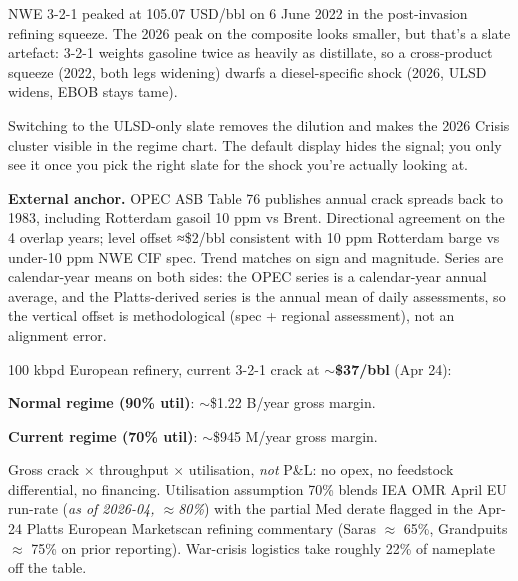 \documentclass[10pt,a4paper]{article}
\begin{document}
\noindent\begin{minipage}[t]{0.50\linewidth}\vspace{0pt}

\mbox{NWE} 3-2-1 peaked at 105.07 USD/bbl on 6 June 2022 in the post-invasion refining squeeze. The 2026 peak on the composite looks smaller, but that's a slate artefact: 3-2-1 weights gasoline twice as heavily as distillate, so a cross-product squeeze (2022, both legs widening) dwarfs a diesel-specific shock (2026, ULSD widens, EBOB stays tame).

Switching to the ULSD-only slate removes the dilution and makes the 2026 Crisis cluster visible in the regime chart. The default display hides the signal; you only see it once you pick the right slate for the shock you're actually looking at.

\textbf{External anchor.} OPEC ASB Table 76 publishes annual crack spreads back to 1983, including Rotterdam gasoil 10 ppm vs Brent. Directional agreement on the 4 overlap years; level offset ≈\$2/bbl consistent with 10 ppm Rotterdam barge vs under-10 ppm \mbox{NWE} CIF spec. Trend matches on sign and magnitude. Series are calendar-year means on both sides: the OPEC series is a calendar-year annual average, and the Platts-derived series is the annual mean of daily assessments, so the vertical offset is methodological (spec + regional assessment), not an alignment error.

\vspace{0.2cm}
\begin{callout}
\footnotesize
100 kbpd European refinery, current 3-2-1 crack at \textbf{$\sim$\$37/bbl} (Apr 24):
\smallskip

\textbf{Normal regime (90\% util)}: $\sim$\$1.22 B/year gross margin.
\smallskip

\textbf{Current regime (70\% util)}: $\sim$\$945 M/year gross margin.
\smallskip

Gross crack $\times$ throughput $\times$ utilisation, \emph{not} P\&L: no opex, no feedstock differential, no financing. Utilisation assumption 70\% blends IEA OMR April EU run-rate (\textit{as of 2026-04, $\approx$80\%}) with the partial Med derate flagged in the Apr-24 Platts European Marketscan refining commentary (Saras $\approx$ 65\%, Grandpuits $\approx$ 75\% on prior reporting). War-crisis logistics take roughly 22\% of nameplate off the table.
\end{callout}

\end{minipage}\hfill
\end{document}
